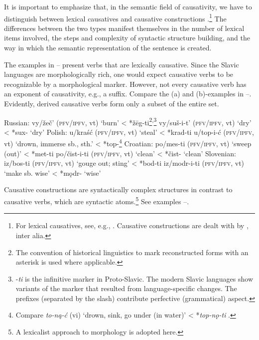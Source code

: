 \documentclass[output=paper]{langscibook}
\begin{document}
\noindent It is important to emphasize that, in the semantic field of causativity, we have to distinguish between lexical causatives and causative constructions \citep{Kulikov2001}.\footnote{For lexical causatives, see, e.g., \citet{Fabricius-Hansen1991}. Causative constructions are dealt with by 
\citet{Song2011b,Song2011a}, inter alia.} The differences between the two types manifest themselves in the number of lexical items involved, the steps and complexity of syntactic structure building, and the way in which the semantic representation of the sentence is created.

The examples in -- present verbs that are lexically causative. Since the Slavic languages are morphologically rich, one would expect causative verbs to be recognizable by a morphological marker. However, not every causative verb has an exponent of causativity, e.g., a suffix. Compare the (a) and (b)-examples in --. Evidently, derived causative verbs form only a subset of the entire set.
\largerpage[2]

\ea%
    Russian: \label{ex:junghanns:2}
  \ea  vy/žeč’ (\textsc{pfv}/\textsc{ipfv}, vt) ‘burn’ < *žēg-ti\footnote{The convention of historical linguistics to mark reconstructed forms with an asterisk is used where applicable.}\textsuperscript{,}\footnote{{}-\textit{ti} is the infinitive marker in Proto-Slavic. The modern Slavic languages show variants of the marker that resulted from language-specific changes. The prefixes (separated by the slash) contribute perfective (grammatical) aspect.}
  \ex vy/suš-i-t’ (\textsc{pfv}/\textsc{ipfv}, vt) ‘dry’ < *sux- ‘dry’     
\z
\ex%
    Polish: \label{ex:junghanns:3}
  \ea    u/kraść (\textsc{pfv}/\textsc{ipfv}, vt) ‘steal’ < *krad-ti
  \ex u/top-i-ć (\textsc{pfv}/\textsc{ipfv}, vt) ‘drown, immerse sb., sth.’ < *top-\footnote{Compare \textit{to-n}\textrm{\textit{ą}}\textit{{}-ć} (vi) ‘drown, sink, go under (in water)’ < *\textit{top-n}\textrm{\textit{ǫ}}\textit{{}-ti} \citep[60]{Leskien1922}.}     
\z
\ex%
    Croatian: \label{ex:junghanns:4}
  \ea po/mes-ti (\textsc{pfv}/\textsc{ipfv}, vt) ‘sweep (out)’ < *met-ti
  \ex po/čist-i-ti (\textsc{pfv}/\textsc{ipfv}, vt) ‘clean’ < *čist- ‘clean’     
\z
\ex%
    Slovenian: \label{ex:junghanns:5}
  \ea iz/bos-ti (\textsc{pfv}/\textsc{ipfv}, vt) ‘gouge out; sting’ < *bod-ti
  \ex iz/modr-i-ti (\textsc{pfv}/\textsc{ipfv}, vt) ‘make sb. wise’ < *mǫdr- ‘wise’ 
\z
\z

\noindent Causative constructions are syntactically complex structures in contrast to causative verbs, which are syntactic atoms.\footnote{A lexicalist approach to morphology is adopted here.} See examples --.
\end{document}
